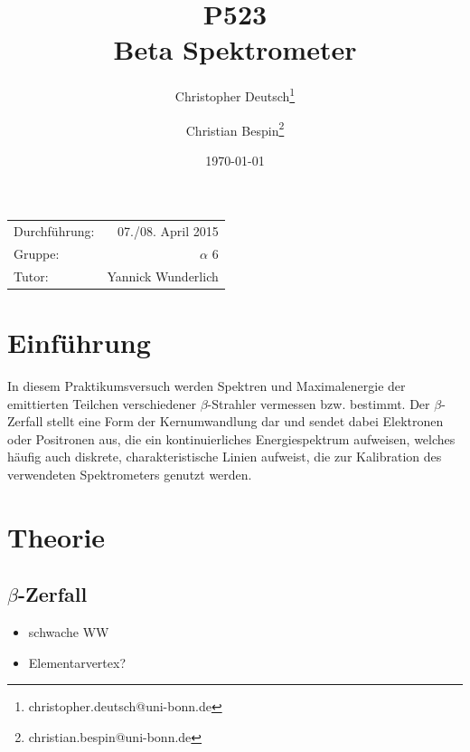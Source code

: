 \documentclass[11pt, a4paper]{article}
\title{P523 \\ Beta Spektrometer}
\author{Christopher Deutsch\footnote{christopher.deutsch@uni-bonn.de} \and Christian Bespin\footnote{christian.bespin@uni-bonn.de}}
\date{\today}
\numberwithin{equation}{section}
\begin{document}
\begin{titlepage}

\maketitle

\begin{center}
\begin{tabular}{l r}
Durchführung: & 07./08. April 2015 \\
Gruppe: & $\alpha$ 6 \\
Tutor: & Yannick Wunderlich
\end{tabular}
\end{center}

\begin{abstract}
\noindent
\end{abstract}

\end{titlepage}

\tableofcontents
\newpage


\section{Einführung}

In diesem Praktikumsversuch werden Spektren und Maximalenergie der emittierten Teilchen verschiedener $\beta$-Strahler vermessen bzw. bestimmt.
Der $\beta$-Zerfall stellt eine Form der Kernumwandlung dar und sendet dabei Elektronen oder Positronen aus, die ein kontinuierliches Energiespektrum aufweisen, welches häufig auch diskrete, charakteristische Linien aufweist, die zur Kalibration des verwendeten Spektrometers genutzt werden.

\section{Theorie}
\subsection{$\beta$-Zerfall}
\begin{itemize}
	\item schwache WW
	\item Elementarvertex?
\end{itemize}
\end{document}
